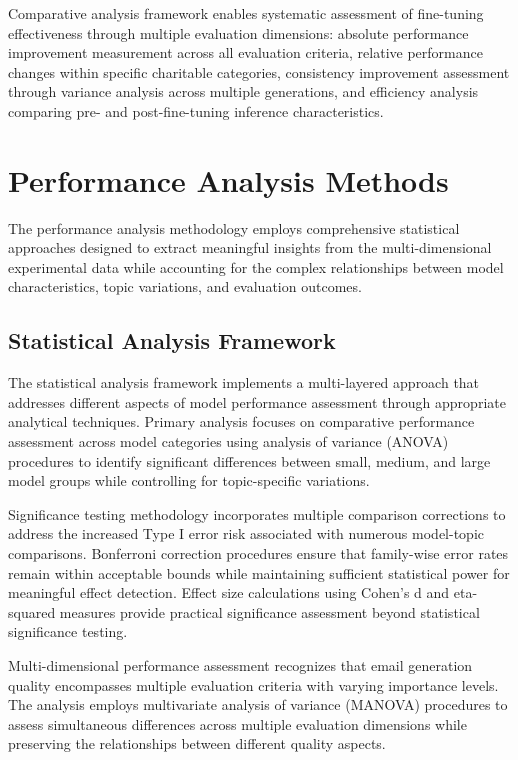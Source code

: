 Comparative analysis framework enables systematic assessment of fine-tuning effectiveness through multiple evaluation dimensions: absolute performance improvement measurement across all evaluation criteria, relative performance changes within specific charitable categories, consistency improvement assessment through variance analysis across multiple generations, and efficiency analysis comparing pre- and post-fine-tuning inference characteristics.

\section{Performance Analysis Methods}
\label{sec:performance-analysis}

The performance analysis methodology employs comprehensive statistical approaches designed to extract meaningful insights from the multi-dimensional experimental data while accounting for the complex relationships between model characteristics, topic variations, and evaluation outcomes.

\subsection{Statistical Analysis Framework}

The statistical analysis framework implements a multi-layered approach that addresses different aspects of model performance assessment through appropriate analytical techniques. Primary analysis focuses on comparative performance assessment across model categories using analysis of variance (ANOVA) procedures to identify significant differences between small, medium, and large model groups while controlling for topic-specific variations.

Significance testing methodology incorporates multiple comparison corrections to address the increased Type I error risk associated with numerous model-topic comparisons. Bonferroni correction procedures ensure that family-wise error rates remain within acceptable bounds while maintaining sufficient statistical power for meaningful effect detection. Effect size calculations using Cohen's d and eta-squared measures provide practical significance assessment beyond statistical significance testing.

Multi-dimensional performance assessment recognizes that email generation quality encompasses multiple evaluation criteria with varying importance levels. The analysis employs multivariate analysis of variance (MANOVA) procedures to assess simultaneous differences across multiple evaluation dimensions while preserving the relationships between different quality aspects.

